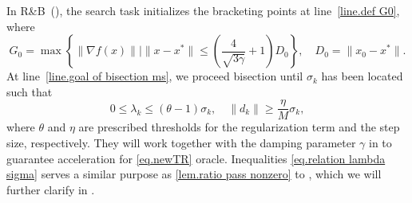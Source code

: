 \documentclass{article}
\numberwithin{equation}{section}
\newcommand{\trp}{\textrm{TR}_+}
\numberwithin{equation}{section}
\begin{document}
\begin{subroutine}[!ht]
    \caption{Ratio Bracketing and Bisection~(R\&B) for }\label{alg.bisection ms}
    \begin{algorithmic}[1]
        \STATE{Set $\sigma_- = \sqrt{\frac{2M\epsilon_g}{1+2\theta}}, \ \sigma_+=\sqrt{\frac{MG_0}{\eta}}$, $(d_-,\lambda_-) = \trp(y(\sigma_-),\sigma_-,\frac{1}{M}\sigma_-)$
            \label{line.def G0}
        }
        \label{line.early termination criterion}
        \label{line.early termination ms}
        \ELSE
        \label{line.goal of bisection ms}
        \STATE{$(d,\lambda) = \trp(y(\sigma),\sigma,\frac{1}{M}\sigma)$\label{line.call-utr-bisec}}
        \STATE{$\sigma_+ =\sigma$}
        \STATE{$\sigma_- =\sigma$}
        \ENDIF
        \ENDWHILE
        \ENDIF
    \end{algorithmic}
\end{subroutine}
In R\&B~(), the search task initializes the bracketing points at line~\ref{line.def G0}, where
$$G_0 = \max\left\{\|\nabla f(x)\| \mid \|x-x^*\|\leq \left(\frac{4}{\sqrt{3\gamma}}+1\right)D_0\right\}, \quad D_0 = \|x_0-x^*\|.$$
At line~\ref{line.goal of bisection ms}, we proceed bisection until $\sigma_k$ has been located such that
\begin{equation}
    \label{eq.relation lambda sigma}
    0 \leq \lambda_k \leq (\theta - 1)\sigma_k, \quad \|d_k\| \geq \frac{\eta}{M} \sigma_k,
\end{equation}
where $\theta$ and $\eta$ are prescribed thresholds for the regularization term and the step size, respectively. They will work together with the damping parameter $\gamma$ in  to guarantee acceleration for \ref{eq.newTR} oracle. Inequalities \eqref{eq.relation lambda sigma} serves a similar purpose as \eqref{lem.ratio pass nonzero} to , which we will further clarify in .
\end{document}
